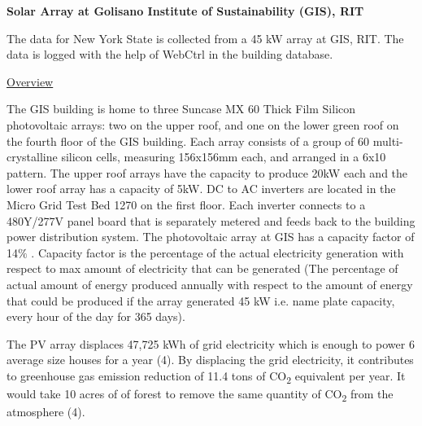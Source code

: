 \documentclass[12pt]{article}
\begin{document}
\vspace{\baselineskip}

\vspace{\baselineskip}

\vspace{\baselineskip}
\begin{justify}
\textbf{Solar Array at Golisano Institute of Sustainability (GIS), RIT}
\end{justify}\par


\vspace{\baselineskip}
\begin{justify}
The data for New York State is collected from a 45 kW array at GIS, RIT. The data is logged with the help of WebCtrl in the building database.
\end{justify}\par


\vspace{\baselineskip}
\begin{justify}
\uline{Overview}
\end{justify}\par

\begin{justify}
The GIS building is home to three Suncase MX 60 Thick Film Silicon photovoltaic arrays: two on the upper roof, and one on the lower green roof on the fourth floor of the GIS building. Each array consists of a group of 60 multi-crystalline silicon cells, measuring 156x156mm each, and arranged in a 6x10 pattern. The upper roof arrays have the capacity to produce 20kW each and the lower roof array has a capacity of 5kW. DC to AC inverters are located in the Micro Grid Test Bed 1270 on the first floor. Each inverter connects to a 480Y/277V panel board that is separately metered and feeds back to the building power distribution system. The photovoltaic array at GIS has a capacity factor of 14$\%$ . Capacity factor is the percentage of the actual electricity generation with respect to max amount of electricity that can be generated (The percentage of actual amount of energy produced annually with respect to the amount of energy that could be produced if the array generated 45 kW i.e. name plate capacity, every hour of the day for 365 days).\  
\end{justify}\par


\vspace{\baselineskip}
\begin{justify}
The PV array displaces 47,725 kWh of grid electricity which is enough to power 6 average size houses for a year (4). By displacing the grid electricity, it contributes to greenhouse gas emission reduction of 11.4 tons of CO\textsubscript{2} equivalent per year. It would take 10 acres of of forest to remove the same quantity of CO\textsubscript{2} from the atmosphere (4). 
\end{justify}\par
\end{document}
